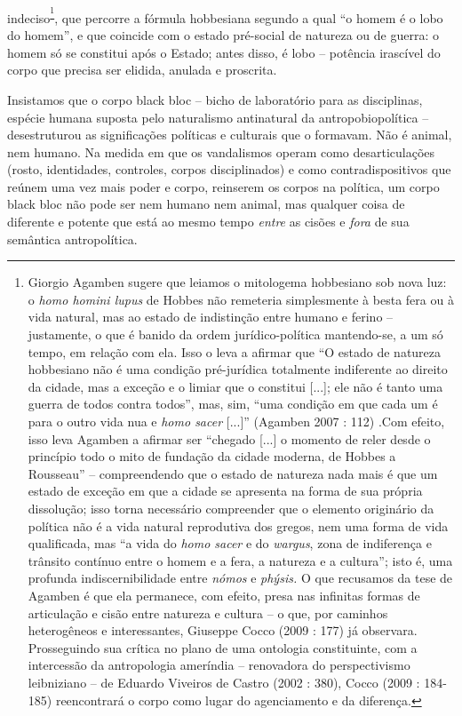 indeciso\textsuperscript{\footnote{Giorgio Agamben sugere que leiamos o
  mitologema hobbesiano sob nova luz: o \emph{homo homini lupus} de
  Hobbes não remeteria simplesmente à besta fera ou à vida natural, mas
  ao estado de indistinção entre humano e ferino -- justamente, o que é
  banido da ordem jurídico-política mantendo-se, a um só tempo, em
  relação com ela. Isso o leva a afirmar que ``O estado de natureza
  hobbesiano não é uma condição pré-jurídica totalmente indiferente ao
  direito da cidade, mas a exceção e o limiar que o constitui {[}...{]};
  ele não é tanto uma guerra de todos contra todos'', mas, sim, ``uma
  condição em que cada um é para o outro vida nua e \emph{homo sacer
  }{[}...{]}'' (Agamben 2007 : 112) .Com efeito, isso leva Agamben a
  afirmar ser ``chegado {[}...{]} o momento de reler desde o princípio
  todo o mito de fundação da cidade moderna, de Hobbes a Rousseau'' --
  compreendendo que o estado de natureza nada mais é que um estado de
  exceção em que a cidade se apresenta na forma de sua própria
  dissolução; isso torna necessário compreender que o elemento
  originário da política não é a vida natural reprodutiva dos gregos,
  nem uma forma de vida qualificada, mas ``a vida do \emph{homo sacer} e
  do \emph{wargus}, zona de indiferença e trânsito contínuo entre o
  homem e a fera, a natureza e a cultura''; isto é, uma profunda
  indiscernibilidade entre \emph{nómos }e \emph{phýsis. }O que recusamos
  da tese de Agamben é que ela permanece, com efeito, presa nas
  infinitas formas de articulação e cisão entre natureza e cultura -- o
  que, por caminhos heterogêneos e interessantes, Giuseppe Cocco (2009 :
  177) já observara. Prosseguindo sua crítica no plano de uma ontologia
  constituinte, com a intercessão da antropologia ameríndia --
  renovadora do perspectivismo leibniziano -- de Eduardo Viveiros de
  Castro (2002 : 380), Cocco (2009 : 184-185) reencontrará o corpo como
  lugar do agenciamento e da diferença. }}, que percorre a fórmula
hobbesiana segundo a qual ``o homem é o lobo do homem'', e que coincide
com o estado pré-social de natureza ou de guerra: o homem só se
constitui após o Estado; antes disso, é lobo -- potência irascível do
corpo que precisa ser elidida, anulada e proscrita.

Insistamos que o corpo black bloc -- bicho de laboratório para as
disciplinas, espécie humana suposta pelo naturalismo antinatural da
antropobiopolítica -- desestruturou as significações políticas e
culturais que o formavam. Não é animal, nem humano. Na medida em que os
vandalismos operam como desarticulações (rosto, identidades, controles,
corpos disciplinados) e como contradispositivos que reúnem uma vez mais
poder e corpo, reinserem os corpos na política, um corpo black bloc não
pode ser nem humano nem animal, mas qualquer coisa de diferente e
potente que está ao mesmo tempo \emph{entre }as cisões e
\emph{fora }de sua semântica antropolítica.

